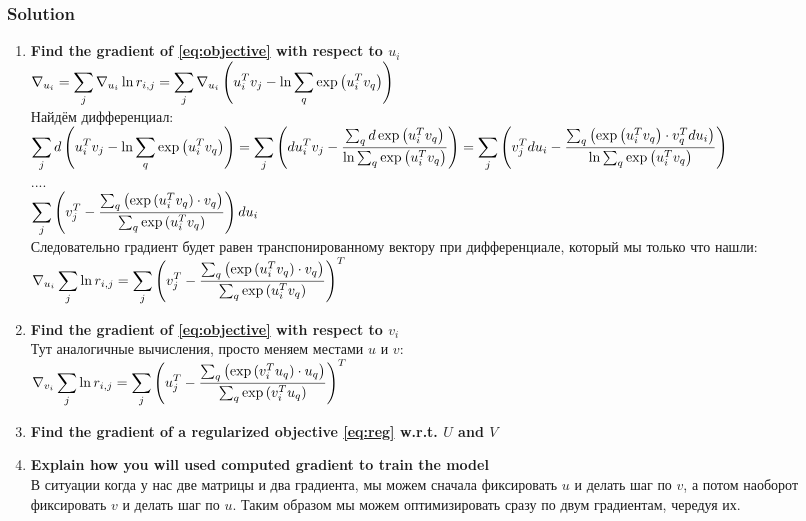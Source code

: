 \documentclass{article}
\newcommand{\block}[1]{\vspace{-1em}\begin{framed}#1\end{framed}\vspace{-\lastskip}\vspace{-.1cm}\hfill}
\newcommand{\red}[1]{{\color{red}{#1}}}
\newcommand{\TODO}{\texttt{\red{TODO}}}
\begin{document}
\subsubsection*{Solution}
\block{
  \begin{enumerate}
    \item \textbf{Find the gradient of \eqref{eq:objective} with respect to $u_i$} \\
      $\displaystyle \nabla_{u_i}  = \sum_j \nabla_{u_i} \ln r_{i, j}
      = \sum_j \nabla_{u_i} \left(u_i^Tv_j - \ln\sum_q\exp\left(u_i^T v_q\right)\right)$ \vspace{0.5em} \\
      Найдём дифференциал: \vspace{0.5em} \\
      $\displaystyle \sum_j d \left(u_i^Tv_j - \ln\sum_q\exp\left(u_i^T v_q\right)\right) = \sum_j\left(
      d u_i^Tv_j - \frac{\sum_qd\exp\left(u_i^T v_q\right)}{\ln\sum_q\exp\left(u_i^T v_q\right)} \right) = \sum_j\left(
      v_j^Tdu_i - \frac{\sum_q\left(\exp\left(u_i^T v_q\right) \cdot v_q^Tdu_i\right)}{\ln\sum_q\exp\left(u_i^T v_q\right)} \right) $ \vspace{0.5em} \\
      .... \vspace{0.5em} \\
      $\displaystyle \sum_j\left(v_j^T - \frac{\sum_q\left(\exp{(u_i^Tv_q)}\cdot v_q\right)}{\sum_q\exp{(u_i^Tv_q)}}\right) du_i$ \vspace{0.5em} \\
      Следовательно градиент будет равен транспонированному вектору при дифференциале, который мы только что нашли: \vspace{0.5em} \\
      $\displaystyle \nabla_{u_i} \sum_j \ln r_{i, j} = \sum_j\left(v_j^T - \frac{\sum_q\left(\exp{(u_i^Tv_q)}\cdot v_q\right)}{\sum_q\exp{(u_i^Tv_q)}}\right)^T$

    \item \textbf{Find the gradient of \eqref{eq:objective} with respect to $v_i$} \\
      Тут аналогичные вычисления, просто меняем местами $u$ и $v$: \vspace{0.5em} \\
      $\displaystyle \nabla_{v_i} \sum_j \ln r_{i, j} = \sum_j\left(u_j^T - \frac{\sum_q\left(\exp{(v_i^Tu_q)}\cdot u_q\right)}{\sum_q\exp{(v_i^Tu_q)}}\right)^T$

    \item \textbf{Find the gradient of a regularized objective \eqref{eq:reg} w.r.t. $U$ and $V$} \\
      \TODO

    \item \textbf{Explain how you will used computed gradient to train the model} \\
      В ситуации когда у нас две матрицы и два градиента, мы можем сначала фиксировать $u$ и делать шаг по $v$,
      а потом наоборот фиксировать $v$ и делать шаг по $u$.
      Таким образом мы можем оптимизировать сразу по двум градиентам, чередуя их.


\end{enumerate}}
\end{document}
